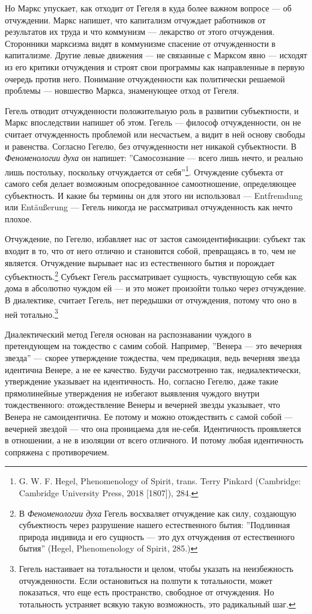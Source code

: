 \documentclass[12pt]{book}
\begin{document}
Но Маркс упускает, как отходит от Гегеля в куда более важном вопросе --- об отчуждении. Маркс напишет, что капитализм отчуждает работников от результатов их труда и что коммунизм --- лекарство от этого отчуждения. Сторонники марксизма видят в коммунизме спасение от отчужденности в капитализме. Другие левые движения --- не связанные с Марксом явно --- исходят из его критики отчуждения и строят свои программы как направленные в первую очередь против него. Понимание отчужденности как политически решаемой проблемы --- новшество Маркса, знаменующее отход от Гегеля.

Гегель отводит отчужденности положительную роль в развитии субъектности, и Маркс впоследствии напишет об этом. Гегель --- философ отчужденности, он не считает отчужденность проблемой или несчастьем, а видит в ней основу свободы и равенства. Согласно Гегелю, без отчужденности нет никакой субъектности. В \textit{Феноменологии духа} он напишет: ''Самосознание --- всего лишь нечто, и реально лишь постольку, поскольку отчуждается от себя''\footnote{G. W. F. Hegel, Phenomenology of Spirit, trans. Terry Pinkard (Cambridge: Cambridge University Press, 2018 [1807]), 284.}. Отчуждение субъекта от самого себя делает возможным опосредованное самоотношение, определяющее субъектность. И какие бы термины он для этого ни использовал --- Entfremdung или Entäußerung --- Гегель никогда не рассматривал отчужденность как нечто плохое.

Отчуждение, по Гегелю, избавляет нас от застоя самоидентификации: субъект так входит в то, что от него отлично и становится собой, превращаясь в то, чем не является. Отчуждение вырывает нас из естественного бытия и порождает субъектность.\footnote{В \textit{Феноменологии духа} Гегель восхваляет отчуждение как силу, создающую субъектность через разрушение нашего естественного бытия: ''Подлинная природа индивида и его сущность --- это дух отчуждения от естественного бытия'' (Hegel, Phenomenology of Spirit, 285.)} Субъект Гегель рассматривает сущность, чувствующую себя как дома в абсолютно чуждом ей --- и это может произойти только через отчуждение. В диалектике, считает Гегель, нет передышки от отчуждения, потому что оно в ней тотально.\footnote{Гегель настаивает на тотальности и целом, чтобы указать на неизбежность отчужденности. Если остановиться на полпути к тотальности, может показаться, что еще есть пространство, свободное от отчуждения. Но тотальность устраняет всякую такую возможность, это радикальный шаг.}

Диалектический метод Гегеля основан на распознавании чуждого в претендующем на тождество с самим собой. Например, ''Венера --- это вечерняя звезда'' --- скорее утверждение тождества, чем предикация, ведь вечерняя звезда идентична Венере, а не ее качество. Будучи рассмотренно так, недиалектически, утверждение указывает на идентичность. Но, согласно Гегелю, даже такие прямолинейные утверждения не избегают выявления чуждого внутри тождественного: отождествление Венеры и вечерней звезды указывает, что Венера не самоидентична. Ее потому и можно отождествить с самой собой --- вечерней звездой --- что она проницаема для не-себя. Идентичность проявляется в отношении, а не в изоляции от всего отличного. И потому любая идентичность сопряжена с противоречием.
\end{document}
